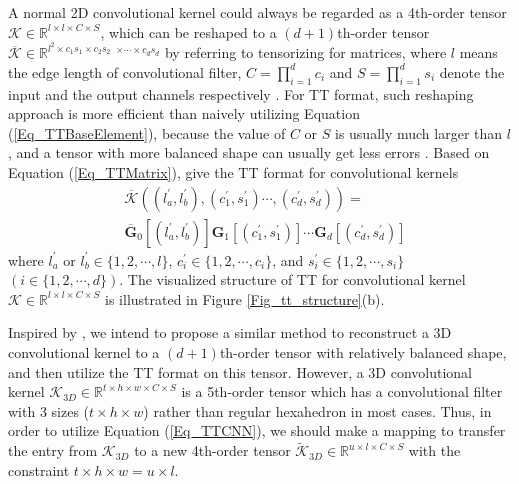 \documentclass[a4paper,fleqn]{cas-dc}
\begin{document}
A normal 2D convolutional kernel could always be regarded as a 4th-order tensor \(\bm{\mathcal{K}} \in \mathbb{R} ^{l \times l \times C \times S}\), which can be reshaped to a \((d+1)\)th-order tensor \(\overline{\bm{\mathcal{K}}} \in \mathbb{R} ^{l^2 \times c_{1}s_{1} \times c_{2}s_{2}}\) \(^{\times \cdots \times c_{d}s_{d}}\) by referring to tensorizing for matrices, where \(l\) means the edge length of convolutional filter, \(C = \prod_{i=1}^d c_i\) and \(S = \prod_{i=1}^d s_i\) denote the input and the output channels respectively \citep{Garipov_2016_TTCNN}. For TT format, such reshaping approach is more efficient than naively utilizing Equation (\ref{Eq_TTBaseElement}), because the value of \(C\) or \(S\) is usually much larger than \(l\), and a tensor with more balanced shape can usually get less errors \citep{Novikov_2015_TT}. Based on Equation (\ref{Eq_TTMatrix}), \citet{Garipov_2016_TTCNN} give the TT format for convolutional kernels
\begin{equation}\label{Eq_TTCNN}
\begin{aligned}
&\overline{\mathcal{K}}((l_a^{'},l_b^{'}),(c_1^{'},s_1^{'})\cdots,(c_d^{'},s_d^{'})) = \\
&\overline{\bm{G}}_0[(l_a^{'},l_b^{'})]\bm{G}_1[(c_1^{'},s_1^{'})]\cdots\bm{G}_d[(c_d^{'},s_d^{'})]
\end{aligned}
\end{equation}
where \(l_a^{'}\) or \(l_b^{'} \in \{1,2,\cdots,l\}\), \(c_i^{'} \in \{{1,2,\cdots,c_i}\}\), and \(s_i^{'} \in \{{1,2,\cdots,s_i}\}\) \((i \in \{1,2,\cdots,d\})\). The visualized structure of TT for convolutional kernel \(\bm{\mathcal{K}} \in \mathbb{R} ^{l \times l \times C \times S}\) is illustrated in Figure \ref{Fig_tt_structure}(b).

Inspired by \citet{Garipov_2016_TTCNN}, we intend to propose a similar method to reconstruct a 3D convolutional kernel to a \((d+1)\)th-order tensor with relatively balanced shape, and then utilize the TT format on this tensor. However, a 3D convolutional kernel \(\bm{\mathcal{K}} _{3D} \in \mathbb{R} ^{t \times h \times w \times C \times S}\) is a 5th-order tensor which has a convolutional filter with 3 sizes (\(t \times h \times w\)) rather than regular hexahedron in most cases. Thus, in order to utilize Equation (\ref{Eq_TTCNN}), we should make a mapping to transfer the entry from \(\bm{\mathcal{K}} _{3D}\) to a new 4th-order tensor \(\widetilde{\bm{\mathcal{K}}} _{3D} \in \mathbb{R} ^{u \times l \times C \times S}\) with the constraint \(t \times h \times  w = u \times  l\).
\end{document}

